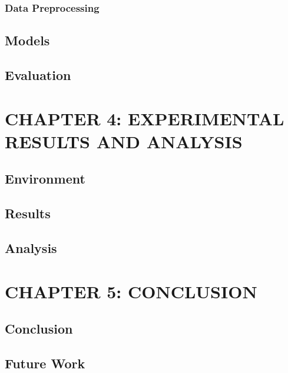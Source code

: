 \documentclass[12pt]{article}
\begin{document}
\subsubsection{Data Preprocessing}


\subsection{Models}

\subsection{Evaluation}
\newpage
\section{CHAPTER 4: EXPERIMENTAL RESULTS AND ANALYSIS}
\subsection{Environment}

\subsection{Results}

\subsection{Analysis}
\newpage
\section{CHAPTER 5: CONCLUSION}

\subsection{Conclusion}

\subsection{Future Work}
\newpage
\printbibliography[heading=bibintoc,title={REFERENCES}]
\end{document}
